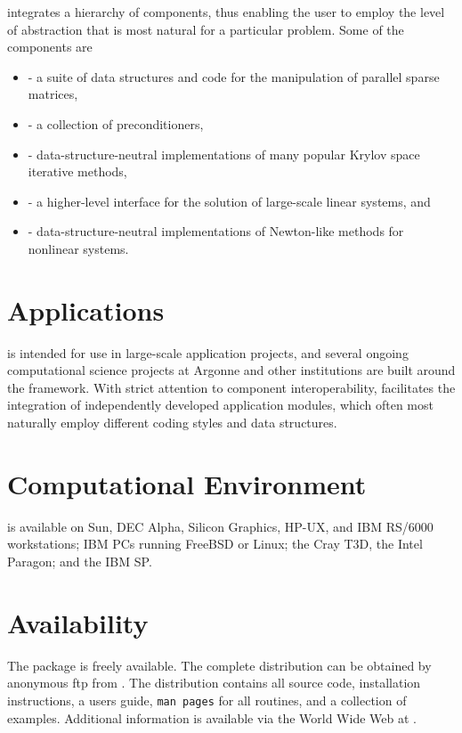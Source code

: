  integrates a hierarchy of components, thus
enabling the user to employ the level of abstraction that is most
natural for a particular problem.  Some of the components are
\vspace{-.4cm}
\begin{itemize}
\item {} - a suite of data structures and code
      for the manipulation of parallel sparse matrices,
\vsp
\item {} - a collection of preconditioners,
\vsp
\item {} - data-structure-neutral implementations of
      many popular Krylov space iterative methods,
\vsp
\item {} - a higher-level interface for the solution of
      large-scale linear systems, and
\vsp
\item {} - data-structure-neutral implementations of Newton-like
      methods for nonlinear systems.
\end{itemize}
\vsp

\section*{Applications}
 is intended for use in large-scale application projects, and
several ongoing computational science projects at Argonne
and other institutions are built around the  framework.
With strict attention to component interoperability, 
facilitates the integration of independently developed application
modules, which often most naturally employ different coding styles and
data structures. 

\section*{Computational Environment}
 is available on Sun, DEC Alpha, Silicon Graphics, HP-UX, and IBM
RS/6000 workstations; IBM PCs running FreeBSD or Linux; the Cray T3D,
the Intel Paragon; and the IBM SP.

\section*{Availability}

The  package is freely available.
The complete distribution can be obtained by anonymous ftp from 
.
The  distribution contains all source code, installation
instructions, a users guide, {\tt man pages} for all routines, and a
collection of examples.  Additional information is available via the
World Wide Web at
.

\vspace{-.1cm}
\makeinfo

